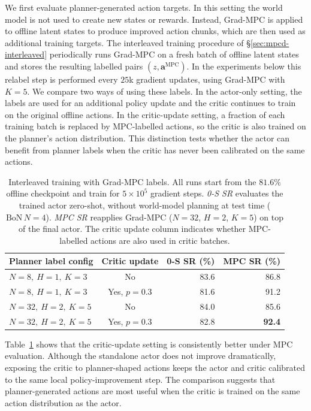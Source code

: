 We first evaluate planner-generated action targets. In this setting the
world model is not used to create new states or rewards. Instead,
Grad-MPC is applied to offline latent states to produce improved action
chunks, which are then used as additional training targets.
The interleaved training procedure of \S\ref{sec:mpcd-interleaved}
periodically runs Grad-MPC on a fresh batch of offline latent states and
stores the resulting labelled pairs
$(z,\mathbf{a}^{\mathrm{MPC}})$. In the experiments below this
relabel step is performed every $25$k gradient updates, using
Grad-MPC with $K=5$.
We compare two ways of using these labels. In the actor-only setting,
the labels are used for an additional policy update and the critic
continues to train on the original offline actions. In the critic-update
setting, a fraction of each training batch is replaced by MPC-labelled
actions, so the critic is also trained on the planner's action
distribution. This distinction tests whether the actor can benefit from
planner labels when the critic has never been calibrated on the same
actions.

\begin{table}[h]
\centering
\caption{Interleaved training with Grad-MPC labels. All runs start from
the $81.6\%$ offline checkpoint and train for $5\times 10^5$ gradient
steps. \emph{0-S SR} evaluates the trained actor zero-shot, without
world-model planning at test time ($\mathrm{BoN}\,N=4$). \emph{MPC SR} reapplies
Grad-MPC ($N=32$, $H=2$, $K=5$) on top of the final actor. The critic
update column indicates whether MPC-labelled actions are also used in
critic batches.}
\label{tab:mpc-interleaved-grad}
\begin{tabular}{lcrr}
\toprule
Planner label config & Critic update & 0-S SR (\%) & MPC SR (\%) \\
\midrule
$N=8,\ H=1,\ K=3$  & No & 83.6 & 86.8 \\
$N=8,\ H=1,\ K=3$  & Yes, $p=0.3$ & 81.6 & 91.2 \\
$N=32,\ H=2,\ K=5$ & No & 84.0 & 85.6 \\
$N=32,\ H=2,\ K=5$ & Yes, $p=0.3$ & 82.8 & \textbf{92.4} \\
\bottomrule
\end{tabular}
\end{table}

Table~\ref{tab:mpc-interleaved-grad} shows that the critic-update
setting is consistently better under MPC evaluation. Although the
standalone actor does not improve dramatically, exposing the critic to
planner-shaped actions keeps the actor and critic calibrated to the same
local policy-improvement step. The comparison suggests that
planner-generated actions are most useful when the critic is trained on
the same action distribution as the actor.


